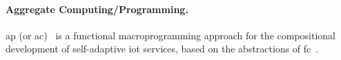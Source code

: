 \documentclass[12pt, a4paper]{article}
\newenvironment{inlinelist}{\begin{enumerate*}[label=\emph{(\roman*)}]}{\end{enumerate*}}
\begin{document}
%
%
%
%

\sloppypar
\paragraph{Aggregate Computing/Programming.}
\ac{ap} (or \ac{ac})~\cite{CASADEI2019252} is a functional macroprogramming approach for the compositional development
of self-adaptive \ac{iot} services,
based on the abstractions of \ac{fc}~\cite{MAMEIZL04}.
\end{document}

